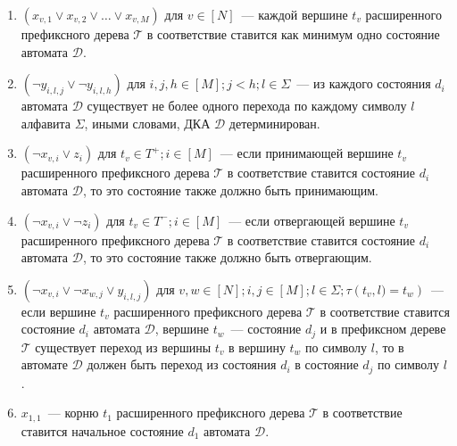 \begin{enumerate}
  \item $\left(x_{v,1} \vee x_{v,2} \vee \ldots \vee x_{v,M}\right)$ для $v \in \left[N\right]$~{---} каждой вершине $t_{v}$ расширенного префиксного дерева $\mathcal{T} $ в соответствие ставится как минимум одно состояние автомата $\mathcal{D}$.
  \item $\left(\neg y_{i,l,j} \vee \neg y_{i,l,h}\right)$ для $i,j,h \in \left[M\right]; j < h; l \in \Sigma$~{---} из каждого состояния $d_{i}$ автомата $\mathcal{D}$ существует не более одного перехода по каждому символу $l$ алфавита $\Sigma$, иными словами, ДКА $\mathcal{D}$ детерминирован.
  \item $\left(\neg x_{v,i} \vee z_{i}\right)$ для $t_{v} \in T^{+}; i \in \left[M\right]$~{---} если принимающей вершине $t_{v}$ расширенного префиксного дерева $\mathcal{T}$ в соответствие ставится состояние $d_{i}$ автомата $\mathcal{D}$, то это состояние также должно быть принимающим.
  \item $\left(\neg x_{v,i} \vee \neg z_{i}\right)$ для $t_{v} \in T^{-}; i \in \left[M\right]$~{---} если отвергающей вершине $t_{v}$ расширенного префиксного дерева $\mathcal{T}$ в соответствие ставится состояние $d_{i}$ автомата $\mathcal{D}$, то это состояние также должно быть отвергающим.
  \item $\left(\neg x_{v,i} \vee \neg x_{w,j} \vee y_{i,l,j}\right)$ для $v,w \in \left[N\right]; i,j \in \left[M\right];l \in \Sigma; \tau\left(t_{v},l) = t_{w}\right)$~{---} если вершине $t_{v}$ расширенного префиксного дерева $\mathcal{T} $ в соответствие ставится состояние $d_{i}$ автомата $\mathcal{D}$, вершине $t_{w}$~{---} состояние $d_{j}$ и в префиксном дереве $\mathcal{T}$ существует переход из вершины $t_{v}$ в вершину $t_{w}$ по символу $l$, то в автомате $\mathcal{D}$ должен быть переход из состояния $d_{i}$ в состояние $d_{j}$ по символу $l$.
  \item $x_{1,1}$~{---} корню $t_{1}$ расширенного префиксного дерева $\mathcal{T} $ в соответствие ставится начальное состояние $d_{1}$ автомата $\mathcal{D}$.
\end{enumerate}


